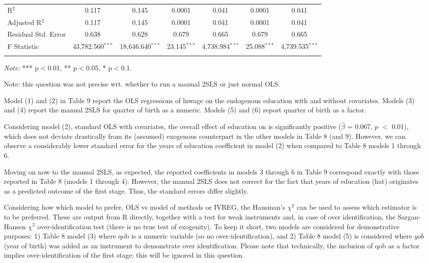 \documentclass[a4paper]{article}
\begin{document}
\begin{table}[!htbp]
\begin{adjustwidth}{0.cm}{-0cm}
\begin{threeparttable}
\begin{tabular}{@{\extracolsep{-4pt}}lcccccc}
R$^{2}$ & 0.117 & 0.145 & 0.0001 & 0.041 & 0.0001 & 0.041 \\ 
Adjusted R$^{2}$ & 0.117 & 0.145 & 0.0001 & 0.041 & 0.0001 & 0.041 \\ 
Residual Std. Error & 0.638 & 0.628 & 0.679 & 0.665  & 0.679& 0.665  \\ 
F Statistic & 43,782.560$^{***}$ & 18,646.640$^{***}$  & 23.145$^{***}$  & 4,738.984$^{***}$ & 25.088$^{***}$ & 4,739.535$^{***}$ \\ 
\hline 
\hline \\[-3.5ex] 
\end{tabular} 
\begin{tablenotes}
      \small
      \item\textit{Note:} *** p$<$0.01, ** p$<$0.05, * p$<$0.1.
    \end{tablenotes}
\end{threeparttable}
\end{adjustwidth}
%
\end{table}

Note: this question was not precise wrt. whether to run a manual 2SLS or just normal OLS.

Model (1) and (2) in Table 9 report the OLS regressions of lnwage on the endogenous education with and without covariates. Models (3) and (4) report the manual 2SLS for quarter of birth as a numeric. Models (5) and (6) report quarter of birth as a factor. 

\indent Considering model (2), standard OLS with covariates, the overall effect of education on is significantly positive ($\hat{\beta}$ = 0.067, $p$ $<$ 0.01), which does not deviate drastically from its (assumed) exogenous counterpart in the other models in Table 8 (and 9). However, we can observe a considerably lower standard error for the years of education coefficient in model (2) when compared to Table 8 models 1 through 6.

\indent Moving on now to the manual 2SLS, as expected, the reported coefficients in models 3 through 6 in Table 9 correspond exactly with those reported in Table 8 (models 1 through 4). However, the manual 2SLS does not correct for the fact that years of education (hat) originates as a predicted outcome of the first stage. Thus, the standard errors differ slightly.

\indent Considering how which model to prefer, OLS vs model of methods or IVREG, the Hausman's ${\chi}^2$ can be used to assess which estimator is to be preferred. These are output from R directly, together with a test for weak instruments and, in case of over identification, the Sargan-Hansen ${\chi}^2$ over-identification test (there is no true test of exogenity). To keep it short, two models are considered for demonstrative purposes: 1) Table 8 model (3) where qob is a numeric variable (so no over-identification), and 2) Table 8 model (5) is considered where $yob$ (year of birth) was added as an instrument to demonstrate over identification. Please note that technically, the inclusion of qob as a factor implies over-identification of the first stage; this will be ignored in this question.
\end{document}
